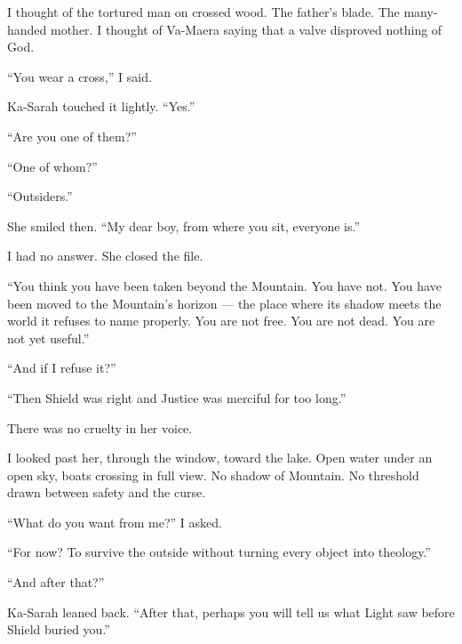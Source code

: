 I thought of the tortured man on crossed wood. The father's blade. The many-handed mother. I thought of Va-Maera saying that a valve disproved nothing of God.\par

``You wear a cross,'' I said.\par

Ka-Sarah touched it lightly. ``Yes.''\par

``Are you one of them?''\par

``One of whom?''\par

``Outsiders.''\par

She smiled then. ``My dear boy, from where you sit, everyone is.''\par

I had no answer. She closed the file.\par

``You think you have been taken beyond the Mountain. You have not. You have been moved to the Mountain's horizon --- the place where its shadow meets the world it refuses to name properly. You are not free. You are not dead. You are not yet useful.''\par

``And if I refuse it?''\par

``Then Shield was right and Justice was merciful for too long.''\par

There was no cruelty in her voice.\par

I looked past her, through the window, toward the lake. Open water under an open sky, boats crossing in full view. No shadow of Mountain. No threshold drawn between safety and the curse.\par

``What do you want from me?'' I asked.\par

``For now? To survive the outside without turning every object into theology.''\par

``And after that?''\par

Ka-Sarah leaned back. ``After that, perhaps you will tell us what Light saw before Shield buried you.''\par

